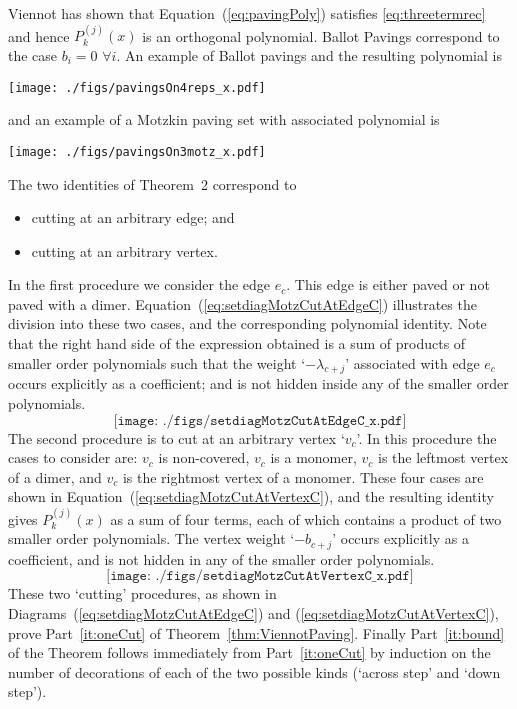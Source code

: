 \documentclass[11pt,a4paper]{article}
\begin{document}
Viennot \cite{Viennot1985ah}  has shown that Equation~(\ref{eq:pavingPoly}) satisfies  \eqref{eq:threetermrec}  and hence $P_k^{(j)}(x)$ is  an orthogonal  polynomial.  Ballot Pavings correspond to the case $b_i=0$ $\forall i$.
%
An example of   Ballot pavings and the resulting polynomial  is
\begin{center}
\texttt{[image: ./figs/pavingsOn4reps\_x.pdf]}
\end{center}
and an example of a Motzkin paving set with associated polynomial  is
\begin{center}
\texttt{[image: ./figs/pavingsOn3motz\_x.pdf]}
\end{center}


The two identities of Theorem~2 correspond to
\begin{itemize}
	\item cutting at an arbitrary edge; and 
	\item cutting at an arbitrary vertex.
\end{itemize}
In the first procedure we consider the edge $e_c$.  This edge is either paved or not paved with a dimer.   Equation~(\ref{eq:setdiagMotzCutAtEdgeC}) illustrates the division into these two cases, and the corresponding polynomial identity.  Note that the right hand side of the expression obtained is a sum of products of smaller order polynomials such that the weight `$-\lambda_{c+j}$' associated with edge $e_c$ occurs explicitly as a coefficient; and is not hidden inside any of the smaller order polynomials.
\begin{equation} \label{eq:setdiagMotzCutAtEdgeC}
\texttt{[image: ./figs/setdiagMotzCutAtEdgeC\_x.pdf]}
\end{equation}
The second procedure is to cut at an arbitrary vertex `$v_c$'.  In this procedure the cases to consider are: $v_c$ is non-covered, $v_c$ is a monomer, $v_c$ is the leftmost vertex of a dimer, and $v_c$ is the rightmost vertex of a monomer.  These four cases are shown in Equation~(\ref{eq:setdiagMotzCutAtVertexC}), and the resulting identity gives $P_k^{(j)}(x)$ as a sum of four terms, each of which contains a product of two smaller order polynomials.  The vertex weight 
`$-b_{c+j}$' occurs explicitly as a coefficient, and is not hidden in any of the smaller order polynomials.
\begin{equation} \label{eq:setdiagMotzCutAtVertexC}
\texttt{[image: ./figs/setdiagMotzCutAtVertexC\_x.pdf]}
\end{equation}
These two `cutting' procedures, as shown in Diagrams~(\ref{eq:setdiagMotzCutAtEdgeC}) and (\ref{eq:setdiagMotzCutAtVertexC}), prove Part~\ref{it:oneCut} of Theorem~\ref{thm:ViennotPaving}.
Finally Part~\ref{it:bound} of the Theorem follows immediately from Part~\ref{it:oneCut} by induction on the number of decorations of each of the two possible kinds (`across step' and `down step').
 
\end{document}

